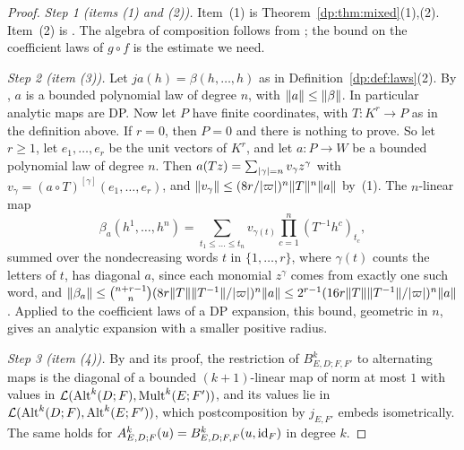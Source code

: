 \begin{proof}
\emph{Step 1 (items (1) and (2)).} Item~(1) is Theorem~\ref{dp:thm:mixed}(1),(2). Item~(2) is \cite[Lemma~Q.3]{I}. The algebra of composition follows from \cite[VI~\S8, Prop.~VI.6, Cor.; Prop.~I.2; II~\S1]{Ro}; the bound on the coefficient laws of $g\circ f$ is the estimate we need.

\emph{Step 2 (item (3)).} Let $ja(h)=\beta(h,\dots,h)$ as in Definition~\ref{dp:def:laws}(2). By \cite[Lemma~Q.1(3)]{I}, $a$ is a bounded polynomial law of degree $n$, with $\lVert a\rVert\le\lVert \beta\rVert$. In particular
analytic maps are DP. Now let $P$ have finite coordinates, with $T\colon K^r\to P$ as in the definition above. If $r=0$, then $P=0$ and there is nothing to prove. So let $r\ge1$, let $e_1,\dots,e_r$ be the unit vectors of $K^r$, and let $a\colon P\to W$ be a bounded polynomial law of degree $n$. Then
$a(Tz)=\sum_{\lvert \gamma\rvert=n}v_\gamma z^\gamma$ with $v_\gamma=(a\circ T)^{[\gamma]}(e_1,\dots,e_r)$, and
$\lVert v_\gamma\rVert\le(8r/\lvert \varpi\rvert)^n\lVert T\rVert^n\lVert a\rVert$ by~(1). The $n$\nobreakdash-linear map
\[
 \beta_a(h^1,\dots,h^n)=\sum_{t_1\le\dots\le t_n}v_{\gamma(t)}\prod_{c=1}^n(T^{-1}h^c)_{t_c},
\]
summed over the nondecreasing words $t$ in $\{1,\dots,r\}$, where $\gamma(t)$ counts the letters of $t$, has diagonal
$a$, since each monomial $z^\gamma$ comes from exactly one such word, and
$\lVert \beta_a\rVert\le\binom{n+r-1}n(8r\lVert T\rVert\lVert T^{-1}\rVert/\lvert \varpi\rvert)^n\lVert a\rVert\le2^{r-1}(16r\lVert T\rVert\lVert T^{-1}\rVert/\lvert \varpi\rvert)^n\lVert a\rVert$.
Applied to the coefficient laws of a DP expansion, this bound, geometric in $n$, gives an analytic expansion with a
smaller positive radius.

\emph{Step 3 (item (4)).} By \cite[Proposition~2.2]{I} and its proof, the restriction of $B^k_{E,D;F,F'}$ to
alternating maps is the diagonal of a bounded $(k+1)$\nobreakdash-linear map of norm at most $1$ with values in
$\mathcal L(\operatorname{Alt}^k(D;F),\operatorname{Mult}^k(E;F'))$, and its values lie in $\mathcal L(\operatorname{Alt}^k(D;F),\operatorname{Alt}^k(E;F'))$, which postcomposition by
$j_{E,F'}$ embeds isometrically. The same holds for $A^k_{E,D;F}(u)=B^k_{E,D;F,F}(u,\mathrm{id}_F)$ in degree $k$.


\end{proof}
